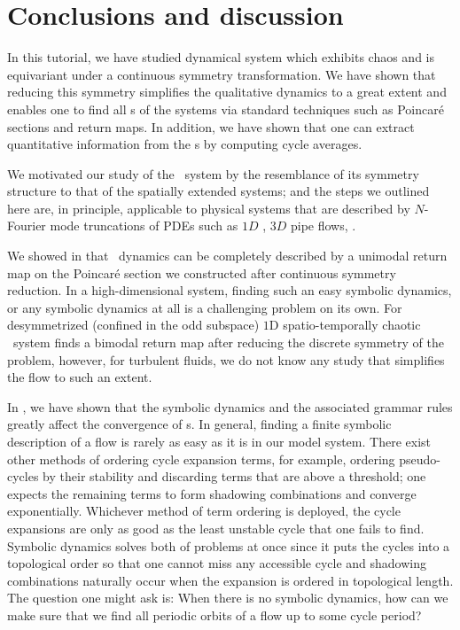 \section{Conclusions and discussion}
\label{s:concl}

In this tutorial, we have studied  dynamical 
system which exhibits chaos and is equivariant under a continuous 
symmetry transformation. We have shown that reducing this symmetry 
simplifies the qualitative dynamics to a great extent and enables 
one to find all \rpo s of the systems via standard techniques such 
as Poincar\'e sections and return maps. In addition, we have shown 
that one can extract quantitative information from the \rpo s by 
computing cycle averages.

We motivated our study of the \twomode\ system by the resemblance of its
symmetry structure to that of the spatially extended systems; and the
steps we outlined here are, in principle, applicable to physical systems
that are described by $N$-Fourier mode truncations of PDEs such as $1D$
\KS, $3D$ pipe flows, \etc.

We showed in  that \twomode\ dynamics can be 
completely described by a unimodal return map on the Poincar\'e 
section we constructed after continuous symmetry reduction. In a 
high-dimensional system, finding such an easy symbolic dynamics, 
or any symbolic dynamics at all is a challenging problem on its 
own. For desymmetrized (confined in the odd subspace) $1$D 
spatio-temporally chaotic \KS\ system  finds a 
bimodal return map after reducing the discrete symmetry of the 
problem, however, for turbulent fluids, we do not know any study 
that simplifies the flow to such an extent.

In , we have shown that the symbolic dynamics and the
associated grammar rules greatly affect the convergence of \cycForm s.
In general, finding a finite symbolic description of a flow is
rarely as easy as it is in our model system.
There exist other methods of ordering cycle
expansion terms, for example, ordering pseudo-cycles by their stability and discarding terms
that are above a threshold; one expects the remaining terms to form
shadowing combinations and converge exponentially.
Whichever method of term ordering is deployed, the cycle expansions are only as good
as the least unstable cycle that one fails to find. Symbolic dynamics solves both
of problems at once since it puts the cycles into a topological order so that
one cannot miss any accessible cycle and shadowing combinations naturally occur
when the expansion is ordered in topological length. The question one might ask
is: When there is no symbolic dynamics, how can we make sure that we find all
periodic orbits of a flow up to some cycle period?

